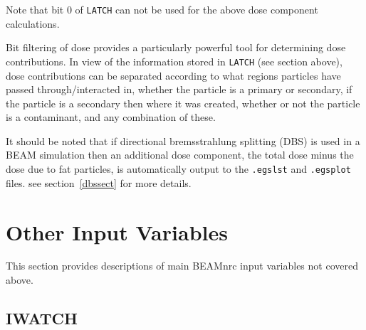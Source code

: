 \documentclass[12pt,twoside]{article}
\begin{document}
Note that bit 0 of \verb+LATCH+ can not be  used for the above dose
component calculations.


Bit filtering of dose provides a particularly powerful tool for
determining dose contributions.  In view of the information stored in
\verb+LATCH+ (see section above), dose contributions can be separated
according to what regions particles have passed through/interacted in,
whether the particle is a primary or secondary, if the particle is a
secondary then where it was created, whether or not the particle is a
contaminant, and any combination of these.

It should be noted that if directional bremsstrahlung splitting (DBS)
is used in a BEAM simulation then an
additional dose component, the total dose minus the dose due to
fat particles, is automatically output to the {\tt .egslst} and
{\tt .egsplot} files.  see section~\ref{dbssect} for more details.

\section{Other Input Variables}
\label{oiv}

This section provides descriptions of main BEAMnrc input variables not
covered above.

\subsection{IWATCH}
\label{iwatchsect}
\end{document}
